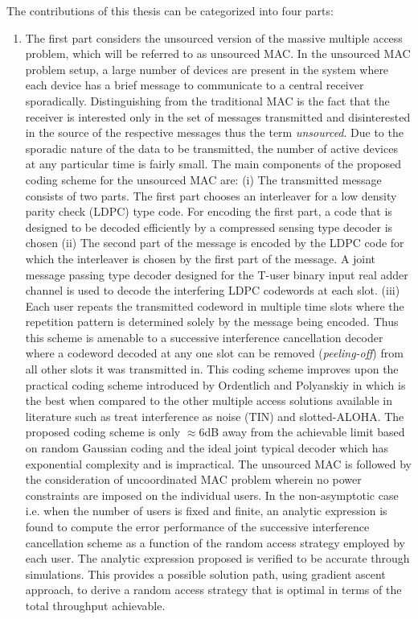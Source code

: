\iflonger
The contributions of this thesis can be categorized into four parts:
\begin{enumerate}
\item The first part considers the unsourced version of the massive multiple access problem, which will be referred to as unsourced MAC. In the unsourced MAC problem setup, a large number of devices are present in the system where each device has a brief message to communicate to a central receiver sporadically. Distinguishing from the traditional MAC is the fact that the receiver is interested only in the set of messages transmitted and disinterested in the source of the respective messages thus the term \textit{unsourced}. Due to the sporadic nature of the data to be transmitted, the number of active devices at any particular time is fairly small. The main components of the proposed coding scheme for the unsourced MAC are: (i) The transmitted message consists of two parts. The first part chooses an interleaver for a low density parity check (LDPC) type code. For encoding the first part, a code that is designed to be decoded efficiently by a compressed sensing type decoder is chosen (ii) The second part of the message is encoded by the LDPC code for which the interleaver is chosen by the first part of the message. A joint message passing type decoder designed for the T-user binary input real adder channel is used to decode the interfering LDPC codewords at each slot. (iii) Each user repeats the transmitted codeword in multiple time slots where the repetition pattern is determined solely by the message being encoded. Thus this scheme is amenable to a successive interference cancellation decoder where a codeword decoded at any one slot can be removed  (\textit{peeling-off}) from all other slots it was transmitted in. This coding scheme improves upon the practical coding scheme introduced by Ordentlich and Polyanskiy in \cite{ordentlich2017low} which is the best when compared to the other multiple access solutions available in literature such as treat interference as noise (TIN) and slotted-ALOHA. The proposed coding scheme is only $\approx 6$dB away from the achievable limit based on random Gaussian coding and the ideal joint typical decoder which has exponential complexity and is impractical.
The unsourced MAC is followed by the consideration of uncoordinated MAC problem wherein no power constraints are imposed on the individual users. In the non-asymptotic case i.e. when the number of users is fixed and finite, an analytic expression is found to compute the error performance of the successive interference cancellation scheme as a function of the random access strategy employed by each user. The analytic expression proposed is verified to be accurate through simulations. This provides a possible solution path, using gradient ascent approach, to derive a random access strategy that is optimal in terms of the total throughput achievable.


\end{enumerate}
